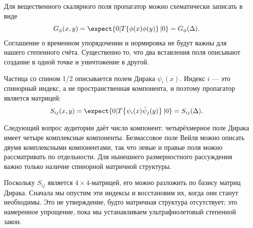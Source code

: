 Для вещественного скалярного поля пропагатор можно схематически записать в виде
\begin{equation}
G_\phi(x,y)=\expect{0|T\!\left\{\phi(x)\phi(y)\right\}|0}
=G_\phi(\Delta).
\end{equation}
Соглашение о временном упорядочении и нормировка не будут важны для нашего степенного счёта. Существенно то, что два вставления поля описывают создание в одной точке и уничтожение в другой.

\begin{classroomqa}
\end{classroomqa}

Частица со спином 1/2 описывается полем Дирака \(\psi_i(x)\). Индекс \(i\) — это спинорный индекс, а не пространственная компонента, и поэтому пропагатор является матрицей:
\begin{equation}
S_{ij}(x,y)=\expect{0|T\!\left\{\psi_i(x)\bar\psi_j(y)\right\}|0}
=S_{ij}(\Delta).
\end{equation}

Следующий вопрос аудитории даёт число компонент: четырёхмерное поле Дирака имеет четыре комплексные компоненты. Безмассовое поле Вейля можно описать двумя комплексными компонентами, так что левые и правые поля можно рассматривать по отдельности. Для нынешнего размерностного рассуждения важно только наличие спинорной матричной структуры.

Поскольку \(S_{ij}\) является \(4\times4\)-матрицей, его можно разложить по базису матриц Дирака. Сначала мы опустим эти индексы и восстановим их, когда они станут необходимы. Это не утверждение, будто матричная структура отсутствует; это намеренное упрощение, пока мы устанавливаем ультрафиолетовый степенной закон.

\begin{classroomqa}
\end{classroomqa}

